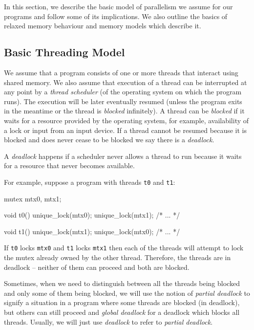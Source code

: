 In this section, we describe the basic model of parallelism we assume for our
programs and follow some of its implications.
We also outline the basics of relaxed memory behaviour and memory models
which describe it.

\subsection{Basic Threading Model}

We assume that a program consists of one or more threads that interact using
shared memory.
We also assume that execution of a thread can be interrupted at any point by a
\emph{thread scheduler} (of the operating system on which the program runs).
The execution will be later eventually resumed (unless the program exits in the meantime or the thread is \emph{blocked} infinitely).
A thread can be \emph{blocked} if it waits for a resource provided by the
operating system, for example, availability of a lock or input from an input
device.
If a thread cannot be resumed because it is blocked and does never cease to be
blocked we say there is a \emph{deadlock}.

\begin{definition}\label{def:deadlock}
    A \emph{deadlock} happens if a scheduler never allows a thread to run
    because it waits for a resource that never becomes available.%
    \begin{marginnote}
      For example, suppose a program with threads \texttt{t0} and \texttt{t1}:

      \medskip
      \begin{cppcode}
        mutex mtx0, mtx1;

        void t0() {
          unique_lock(mtx0);
          unique_lock(mtx1);
          /* ... */
        }

        void t1() {
          unique_lock(mtx1);
          unique_lock(mtx0);
          /* ... */
        }
      \end{cppcode}
      \smallskip

      If \texttt{t0} locks \texttt{mtx0} and \texttt{t1} locks \texttt{mtx1} then each of the threads will attempt to lock the mutex already owned by the other thread.
      Therefore, the threads are in deadlock -- neither of them can proceed and both are blocked.
    \end{marginnote}

    Sometimes, when we need to distinguish between all the threads being
    blocked and only some of them being blocked, we will use the notion of
    \emph{partial deadlock} to signify a situation in a program where some
    threads are blocked (in deadlock), but others can still proceed and
    \emph{global deadlock} for a deadlock which blocks all threads.
    Usually, we will just use \emph{deadlock} to refer to \emph{partial deadlock}.
\end{definition}

